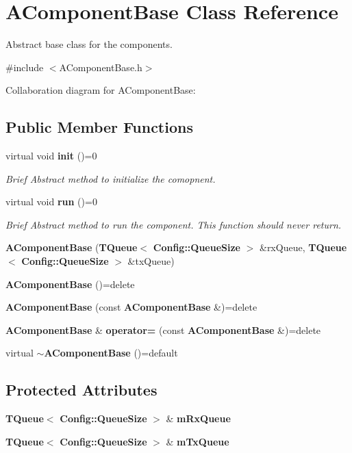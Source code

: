 \section{A\-Component\-Base Class Reference}
\label{classAComponentBase}


Abstract base class for the components.  




{\ttfamily \#include $<$A\-Component\-Base.\-h$>$}



Collaboration diagram for A\-Component\-Base\-:
\subsection*{Public Member Functions}
\begin{DoxyCompactItemize}
\item 
virtual void {\bf init} ()=0
\begin{DoxyCompactList}\small\item\em Brief Abstract method to initialize the comopnent. \end{DoxyCompactList}\item 
virtual void {\bf run} ()=0
\begin{DoxyCompactList}\small\item\em Brief Abstract method to run the component. This function should never return. \end{DoxyCompactList}\item 
{\bf A\-Component\-Base} ({\bf T\-Queue}$<$ {\bf Config\-::\-Queue\-Size} $>$ \&rx\-Queue, {\bf T\-Queue}$<$ {\bf Config\-::\-Queue\-Size} $>$ \&tx\-Queue)
\item 
{\bf A\-Component\-Base} ()=delete
\item 
{\bf A\-Component\-Base} (const {\bf A\-Component\-Base} \&)=delete
\item 
{\bf A\-Component\-Base} \& {\bf operator=} (const {\bf A\-Component\-Base} \&)=delete
\item 
virtual {\bf $\sim$\-A\-Component\-Base} ()=default
\end{DoxyCompactItemize}
\subsection*{Protected Attributes}
\begin{DoxyCompactItemize}
\item 
{\bf T\-Queue}$<$ {\bf Config\-::\-Queue\-Size} $>$ \& {\bf m\-Rx\-Queue}
\item 
{\bf T\-Queue}$<$ {\bf Config\-::\-Queue\-Size} $>$ \& {\bf m\-Tx\-Queue}
\end{DoxyCompactItemize}


